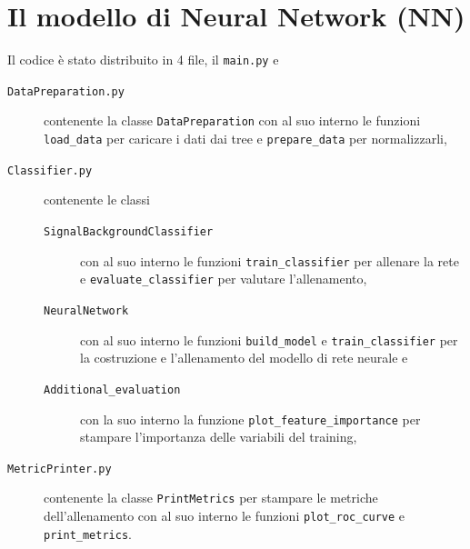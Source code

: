 \newpage

\section{Il modello di Neural Network (NN)}
    Il codice è stato distribuito in 4 file, il \texttt{main.py} e
    \begin{description}
        \item[\texttt{DataPreparation.py}] contenente la classe \texttt{DataPreparation} con al suo interno le funzioni \texttt{load\_data} per caricare i dati dai tree e \texttt{prepare\_data} per normalizzarli,

        \item[\texttt{Classifier.py}] contenente le classi
        \begin{description}
            \item[\texttt{SignalBackgroundClassifier}] con al suo interno le funzioni \texttt{train\_classifier} per allenare la rete e \texttt{evaluate\_classifier} per valutare l'allenamento,

            \item[\texttt{NeuralNetwork}] con al suo interno le funzioni \texttt{build\_model} e \texttt{train\_classifier} per la costruzione e l'allenamento del modello di rete neurale e

            \item[\texttt{Additional\_evaluation}] con la suo interno la funzione \texttt{plot\_feature\_importance} per stampare l'importanza delle variabili del training,
        \end{description}
        
        \item[\texttt{MetricPrinter.py}] contenente la classe \texttt{PrintMetrics} per stampare le metriche dell'allenamento con al suo interno le funzioni \texttt{plot\_roc\_curve} e \texttt{print\_metrics}.
    \end{description}
    
